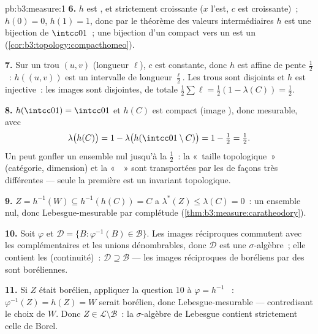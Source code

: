 \begin{solution}{pb:b3:measure:1}
\textbf{6.} $h$ est , et strictement croissante ($x$
l'est, $c$ est croissante)~; $h(0) = 0$, $h(1) = 1$, donc
par le théorème des valeurs intermédiaires $h$ est une
bijection  de $\intcc01$~; une bijection 
d'un compact vers un  est un
 (\cref{cor:b3:topology:compacthomeo}).

\textbf{7.} Sur un trou $(u, v)$ (longueur $\ell$), $c$ est
constante, donc $h$ est affine de pente $\frac12$~:
$h((u,v))$ est un intervalle de longueur $\frac\ell2$. Les
trous sont disjoints et $h$ est injective~: les images sont
disjointes, de  totale $\frac12\sum\ell =
\frac12(1 - \lambda(C)) = \frac12$.

\textbf{8.} $h(\intcc01) = \intcc01$ et $h(C)$ est compact
(image ), donc mesurable, avec
\[
\lambda\bigl(h(C)\bigr) = 1 -
\lambda\bigl(h(\intcc01\setminus C)\bigr) = 1 - \tfrac12 =
\tfrac12 .
\]
Un  peut gonfler un ensemble nul jusqu'à la
 $\frac12$~: la «~taille topologique~» (catégorie,
dimension) et la «~~» sont transportées par les
 de façons très différentes --- seule la
première est un invariant topologique.

\textbf{9.} $Z = h^{-1}(W) \subseteq h^{-1}(h(C)) = C$ a
$\lambda^*(Z) \leq \lambda(C) = 0$~: un ensemble nul, donc
Lebesgue-mesurable par complétude
(\cref{thm:b3:measure:caratheodory}).

\textbf{10.} Soit $\varphi$  et $\mathcal D = \{B :
\varphi^{-1}(B) \in \mathcal B\}$. Les images réciproques
commutent avec les complémentaires et les unions
dénombrables, donc $\mathcal D$ est une $\sigma$-algèbre~;
elle contient les  (continuité)~: $\mathcal D
\supseteq \mathcal B$ --- les images réciproques de
boréliens par des  sont boréliennes.

\textbf{11.} Si $Z$ était borélien, appliquer la question 10
à $\varphi = h^{-1}$ ~: $\varphi^{-1}(Z) = h(Z) =
W$ serait borélien, donc Lebesgue-mesurable --- contredisant
le choix de $W$. Donc $Z \in \mathcal L \setminus \mathcal
B$~: la $\sigma$-algèbre de Lebesgue contient strictement
celle de Borel.


\end{solution}
